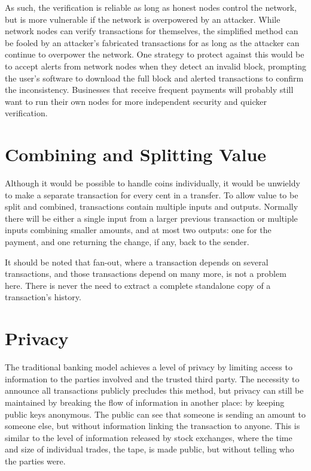 \documentclass{article}
\begin{document}
\begin{center}
\scalebox{0.75}
{}
\end{center}

As such, the verification is reliable as long as honest nodes control the network, but is more vulnerable if the network is overpowered by an attacker.
While network nodes can verify transactions for themselves, the simplified method can be fooled by an attacker's fabricated transactions for as long as the attacker can continue to overpower the network.
One strategy to protect against this would be to accept alerts from network nodes when they detect an invalid block, prompting the user's software to download the full block and alerted transactions to confirm the inconsistency.
Businesses that receive frequent payments will probably still want to run their own nodes for more independent security and quicker verification.


\section{Combining and Splitting Value}\label{sec:combining-and-splitting-value}
Although it would be possible to handle coins individually, it would be unwieldy to make a separate transaction for every cent in a transfer.
To allow value to be split and combined, transactions contain multiple inputs and outputs.
Normally there will be either a single input from a larger previous transaction or multiple inputs combining smaller amounts, and at most two outputs:
one for the payment, and one returning the change, if any, back to the sender.

\begin{center}
\scalebox{0.75}
{}
\end{center}

It should be noted that fan-out, where a transaction depends on several transactions, and those transactions depend on many more, is not a problem here.
There is never the need to extract a complete standalone copy of a transaction's history.


\section{Privacy}\label{sec:privacy}
The traditional banking model achieves a level of privacy by limiting access to information to the parties involved and the trusted third party.
The necessity to announce all transactions publicly precludes this method, but privacy can still be maintained by breaking the flow of information in another place: by keeping public keys anonymous.
The public can see that someone is sending an amount to someone else, but without information linking the transaction to anyone.
This is similar to the level of information released by stock exchanges, where the time and size of individual trades, the {\textquotedbl}tape{\textquotedbl}, is made public, but without telling who the parties were.
\end{document}
